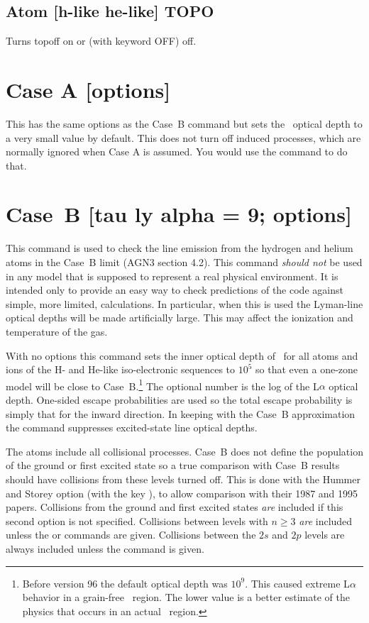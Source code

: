 \subsection{Atom [h-like \OR{} he-like] TOPO} 

Turns topoff on or (with keyword OFF) off.

\section{Case A [options]}

This has the same options as the Case~B command but sets the \la\ optical
depth to a very small value by default.
This does not turn off induced
processes, which are normally ignored when Case A is assumed.
You would
use the  command to do that.

\section{Case~B [tau ly alpha = 9; options]}

This command is used to check the line emission from the hydrogen and
helium atoms in the Case~B limit (AGN3 section 4.2).
This command \emph{should
not} be used in any model that is supposed to represent a real physical
environment.
It is intended only to provide an easy way to check predictions
of the code against simple, more limited, calculations.
In particular,
when this is used the Lyman-line optical depths will be made artificially
large.
This may affect the ionization and temperature of the gas.

With no options this command sets the inner optical depth of
\la\ for all
atoms and ions of the H- and He-like iso-electronic sequences to
$10^5$ so
that even a one-zone model will be close to
Case~B.\footnote{Before version
96 the default optical depth was $10^9$.  This caused
extreme L$\alpha $ behavior in a grain-free \hii\ region.  The lower value is a better
estimate of the physics that occurs in an actual \hii\ region.}
The optional number
is the log of the L$\alpha $ optical depth.
One-sided escape probabilities are
used so the total escape probability is simply that for the inward direction.
In keeping with the Case~B approximation the  command suppresses
excited-state line optical depths.

The atoms include all collisional processes.
Case~B does not define
the population of the ground or first excited state so a true comparison
with Case~B results should have collisions from these levels turned off.
This is done with the Hummer and Storey option (with the key ), to allow
comparison with their 1987 and 1995 papers.
Collisions from the ground
and first excited states \emph{are} included if this second option is not specified.
Collisions between levels with $n\ge  3$ \emph{are} included unless the
or  commands are given.  Collisions
between the $2s$ and $2p$ levels are always included unless the
 command is given.

